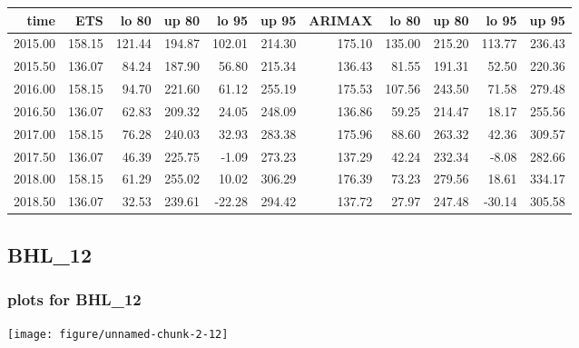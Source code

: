 \documentclass[10pt,a4paper]{article}\usepackage[]{graphicx}\usepackage[]{color}
\makeatletter
\def\maxwidth{ %
  \ifdim\Gin@nat@width>\linewidth
    \linewidth
  \else
    \Gin@nat@width
  \fi
}
\newcommand{\AaA}{\_}
\makeatother
\begin{document}
\begin{table}[ht]
\centering
\begin{tabular}{rrrrrrrrrrr}
  \hline
time & ETS  & lo 80 & up 80 & lo 95 & up 95 & ARIMAX  & lo 80 & up 80 & lo 95 & up 95 \\ 
  \hline
2015.00 & 158.15 & 121.44 & 194.87 & 102.01 & 214.30 & 175.10 & 135.00 & 215.20 & 113.77 & 236.43 \\ 
  2015.50 & 136.07 & 84.24 & 187.90 & 56.80 & 215.34 & 136.43 & 81.55 & 191.31 & 52.50 & 220.36 \\ 
  2016.00 & 158.15 & 94.70 & 221.60 & 61.12 & 255.19 & 175.53 & 107.56 & 243.50 & 71.58 & 279.48 \\ 
  2016.50 & 136.07 & 62.83 & 209.32 & 24.05 & 248.09 & 136.86 & 59.25 & 214.47 & 18.17 & 255.56 \\ 
  2017.00 & 158.15 & 76.28 & 240.03 & 32.93 & 283.38 & 175.96 & 88.60 & 263.32 & 42.36 & 309.57 \\ 
  2017.50 & 136.07 & 46.39 & 225.75 & -1.09 & 273.23 & 137.29 & 42.24 & 232.34 & -8.08 & 282.66 \\ 
  2018.00 & 158.15 & 61.29 & 255.02 & 10.02 & 306.29 & 176.39 & 73.23 & 279.56 & 18.61 & 334.17 \\ 
  2018.50 & 136.07 & 32.53 & 239.61 & -22.28 & 294.42 & 137.72 & 27.97 & 247.48 & -30.14 & 305.58 \\ 
   \hline
\end{tabular}
\end{table}

\newpage
\subsection{BHL\AaA 12}
\subsubsection{plots for BHL\AaA 12}

\texttt{[image: figure/unnamed-chunk-2-12]} 

\newpage
\end{document}
